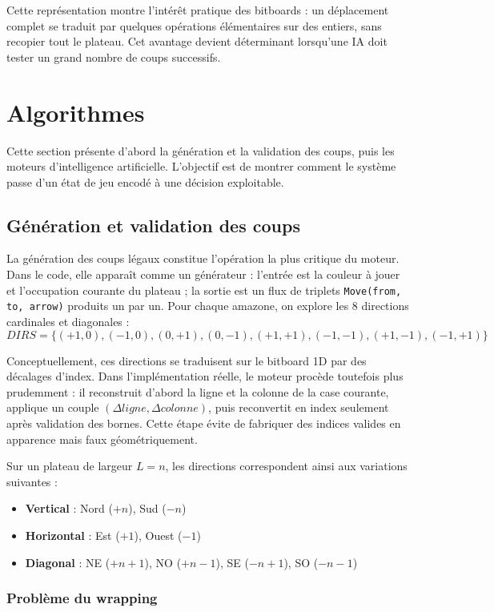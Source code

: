 \documentclass[a4paper]{article}
\begin{document}
Cette représentation montre l'intérêt pratique des bitboards : un déplacement complet se traduit par quelques opérations élémentaires sur des entiers, sans recopier tout le plateau. Cet avantage devient déterminant lorsqu'une IA doit tester un grand nombre de coups successifs.

\section{Algorithmes}

Cette section présente d'abord la génération et la validation des coups, puis les moteurs d'intelligence artificielle. L'objectif est de montrer comment le système passe d'un état de jeu encodé à une décision exploitable.

\subsection{Génération et validation des coups}

La génération des coups légaux constitue l'opération la plus critique du moteur. Dans le code, elle apparaît comme un générateur : l'entrée est la couleur à jouer et l'occupation courante du plateau ; la sortie est un flux de triplets \texttt{Move(from, to, arrow)} produits un par un. Pour chaque amazone, on explore les 8 directions cardinales et diagonales :
\[
DIRS = \{(+1,0), (-1,0), (0,+1), (0,-1), (+1,+1), (-1,-1), (+1,-1), (-1,+1)\}
\]

Conceptuellement, ces directions se traduisent sur le bitboard 1D par des décalages d'index. Dans l'implémentation réelle, le moteur procède toutefois plus prudemment : il reconstruit d'abord la ligne et la colonne de la case courante, applique un couple $(\Delta ligne,\Delta colonne)$, puis reconvertit en index seulement après validation des bornes. Cette étape évite de fabriquer des indices valides en apparence mais faux géométriquement.

Sur un plateau de largeur $L = n$, les directions correspondent ainsi aux variations suivantes :
\begin{itemize}
    \item \textbf{Vertical} : Nord ($+n$), Sud ($-n$)
    \item \textbf{Horizontal} : Est ($+1$), Ouest ($-1$)
    \item \textbf{Diagonal} : NE ($+n{+}1$), NO ($+n{-}1$), SE ($-n{+}1$), SO ($-n{-}1$)
\end{itemize}

\subsubsection{Problème du wrapping}
\end{document}
